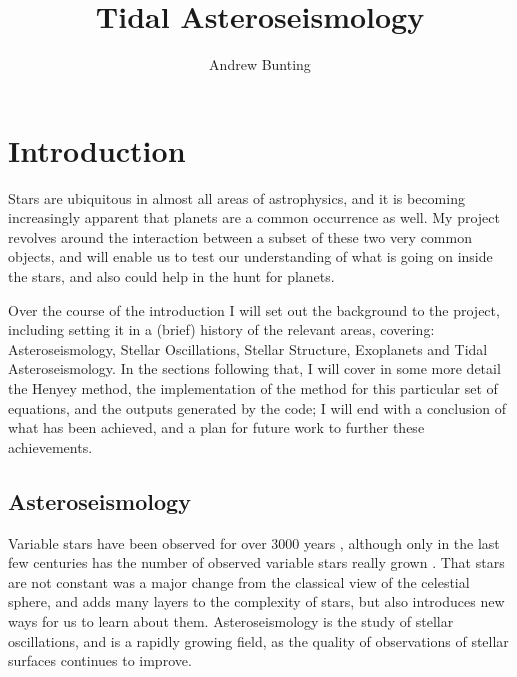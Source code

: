 \documentclass[11pt]{amsart}
\title{Tidal Asteroseismology}
\author{Andrew Bunting}
\begin{document}
\maketitle

\section{Introduction} \label{Introduction}

Stars are ubiquitous in almost all areas of astrophysics, and it is becoming increasingly apparent that planets are a common occurrence as well.  My project revolves around the interaction between a subset of these two very common objects, and will enable us to test our understanding of what is going on inside the stars, and also could help in the hunt for planets.

Over the course of the introduction I will set out the background to the project, including setting it in a (brief) history of the relevant areas, covering: Asteroseismology, Stellar Oscillations, Stellar Structure, Exoplanets and Tidal Asteroseismology.  In the sections following that, I will cover in some more detail the Henyey method, the implementation of the method for this particular set of equations, and the outputs generated by the code; I will end with a conclusion of what has been achieved, and a plan for future work to further these achievements.







\subsection{Asteroseismology} \label{Intro:Asteroseismology}

Variable stars have been observed for over $3000$ years \cite{Jetsu2015}, although only in the last few centuries has the number of observed variable stars really grown \cite{Hoffleit1997}.  That stars are not constant was a major change from the classical view of the celestial sphere, and adds many layers to the complexity of stars, but also introduces new ways for us to learn about them.  Asteroseismology is the study of stellar oscillations, and is a rapidly growing field, as the quality of observations of stellar surfaces continues to improve.
\end{document}
